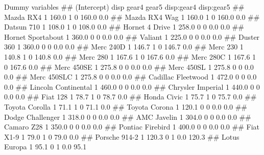 \documentclass[
  ignorenonframetext,
  aspectratio=169]{beamer}
\let\oldverbatim\verbatim %
\let\endoldverbatim\endverbatim
\renewenvironment{verbatim}{\tiny\oldverbatim}{\endoldverbatim}
\begin{document}
\begin{frame}[fragile]{Dummy variables}
\begin{verbatim}
##                     (Intercept)  disp gear4 gear5 disp:gear4 disp:gear5
## Mazda RX4                     1 160.0     1     0      160.0        0.0
## Mazda RX4 Wag                 1 160.0     1     0      160.0        0.0
## Datsun 710                    1 108.0     1     0      108.0        0.0
## Hornet 4 Drive                1 258.0     0     0        0.0        0.0
## Hornet Sportabout             1 360.0     0     0        0.0        0.0
## Valiant                       1 225.0     0     0        0.0        0.0
## Duster 360                    1 360.0     0     0        0.0        0.0
## Merc 240D                     1 146.7     1     0      146.7        0.0
## Merc 230                      1 140.8     1     0      140.8        0.0
## Merc 280                      1 167.6     1     0      167.6        0.0
## Merc 280C                     1 167.6     1     0      167.6        0.0
## Merc 450SE                    1 275.8     0     0        0.0        0.0
## Merc 450SL                    1 275.8     0     0        0.0        0.0
## Merc 450SLC                   1 275.8     0     0        0.0        0.0
## Cadillac Fleetwood            1 472.0     0     0        0.0        0.0
## Lincoln Continental           1 460.0     0     0        0.0        0.0
## Chrysler Imperial             1 440.0     0     0        0.0        0.0
## Fiat 128                      1  78.7     1     0       78.7        0.0
## Honda Civic                   1  75.7     1     0       75.7        0.0
## Toyota Corolla                1  71.1     1     0       71.1        0.0
## Toyota Corona                 1 120.1     0     0        0.0        0.0
## Dodge Challenger              1 318.0     0     0        0.0        0.0
## AMC Javelin                   1 304.0     0     0        0.0        0.0
## Camaro Z28                    1 350.0     0     0        0.0        0.0
## Pontiac Firebird              1 400.0     0     0        0.0        0.0
## Fiat X1-9                     1  79.0     1     0       79.0        0.0
## Porsche 914-2                 1 120.3     0     1        0.0      120.3
## Lotus Europa                  1  95.1     0     1        0.0       95.1
\end{verbatim}
\end{frame}
\end{document}

